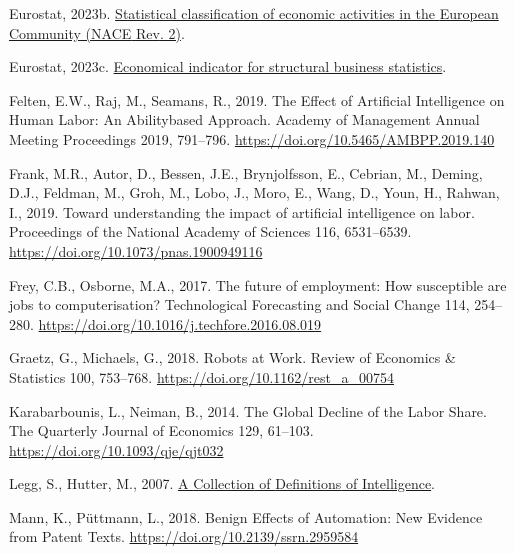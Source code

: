 \documentclass[
  11,
  a4paperpaper,
]{article}
\newlength{\cslhangindent}
\newenvironment{CSLReferences}[2] %
 {\begin{list}{}{%
  \setlength{\itemindent}{0pt}
  \setlength{\leftmargin}{0pt}
  \setlength{\parsep}{0pt}
  \ifodd #1
   \setlength{\leftmargin}{\cslhangindent}
   \setlength{\itemindent}{-1\cslhangindent}
  \fi
  \setlength{\itemsep}{#2\baselineskip}}}
 {\end{list}}
\begin{document}
\begin{CSLReferences}{1}{0}
Eurostat, 2023b.
\href{https://ec.europa.eu/eurostat/api/dissemination/sdmx/2.1/codelist/ESTAT/NACE_R2/?compressed=true&format=TSV&lang=en}{Statistical
classification of economic activities in the {European} {Community}
({NACE} {Rev}. 2)}.

Eurostat, 2023c.
\href{https://ec.europa.eu/eurostat/api/dissemination/sdmx/2.1/codelist/ESTAT/INDIC_SB/?compressed=true&format=TSV&lang=en}{Economical
indicator for structural business statistics}.

Felten, E.W., Raj, M., Seamans, R., 2019. The {Effect} of {Artificial}
{Intelligence} on {Human} {Labor}: {An} {Abilitybased} {Approach}.
Academy of Management Annual Meeting Proceedings 2019, 791--796.
\url{https://doi.org/10.5465/AMBPP.2019.140}

Frank, M.R., Autor, D., Bessen, J.E., Brynjolfsson, E., Cebrian, M.,
Deming, D.J., Feldman, M., Groh, M., Lobo, J., Moro, E., Wang, D., Youn,
H., Rahwan, I., 2019. Toward understanding the impact of artificial
intelligence on labor. Proceedings of the National Academy of Sciences
116, 6531--6539. \url{https://doi.org/10.1073/pnas.1900949116}

Frey, C.B., Osborne, M.A., 2017. The future of employment: {How}
susceptible are jobs to computerisation? Technological Forecasting and
Social Change 114, 254--280.
\url{https://doi.org/10.1016/j.techfore.2016.08.019}

Graetz, G., Michaels, G., 2018. Robots at {Work}. Review of Economics \&
Statistics 100, 753--768. \url{https://doi.org/10.1162/rest_a_00754}

Karabarbounis, L., Neiman, B., 2014. The {Global} {Decline} of the
{Labor} {Share}. The Quarterly Journal of Economics 129, 61--103.
\url{https://doi.org/10.1093/qje/qjt032}

Legg, S., Hutter, M., 2007. \href{http://arxiv.org/abs/0706.3639}{A
{Collection} of {Definitions} of {Intelligence}}.

Mann, K., Püttmann, L., 2018. Benign {Effects} of {Automation}: {New}
{Evidence} from {Patent} {Texts}.
\url{https://doi.org/10.2139/ssrn.2959584}


\end{CSLReferences}
\end{document}
